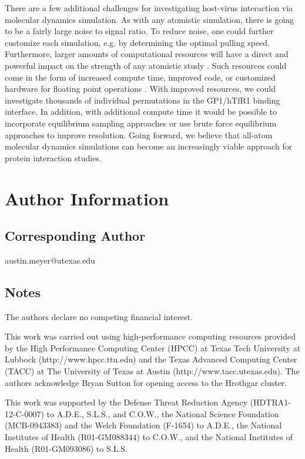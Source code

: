 \documentclass[journal=jacsat,manuscript=article]{achemso}
\begin{document}
There are a few additional challenges for investigating host-virus interaction via molecular dynamics simulation. As with any atomistic simulation, there is going to be a fairly large noise to signal ratio. To reduce noise, one could further customize each simulation, e.g. by determining the optimal pulling speed. Furthermore, larger amounts of computational resources will have a direct and powerful impact on the strength of any atomistic study \cite{Shaw2012}. Such resources could come in the form of increased compute time, improved code, or customized hardware for floating point operations \cite{Shaw2011}. With improved resources, we could investigate thousands of individual permutations in the GP1/hTfR1 binding interface. In addition, with additional compute time it would be possible to incorporate equilibrium sampling approaches \cite{Buch2011} or use brute force equilibrium approaches \cite{Giorgino2012} to improve resolution. Going forward, we believe that all-atom molecular dynamics simulations can become an increasingly viable approach for protein interaction studies. 

\section{Author Information}

\subsection{Corresponding Author}

austin.meyer@utexas.edu

\subsection{Notes}

The authors declare no competing financial interest.

\begin{acknowledgement}
This work was carried out using high-performance computing resources provided by the High Performance Computing Center (HPCC) at Texas Tech University at Lubbock (http://www.hpcc.ttu.edu) and the Texas Advanced Computing Center (TACC) at The University of Texas at Austin (http://www.tacc.utexas.edu). The authors acknowledge Bryan Sutton for opening access to the Hrothgar cluster.

This work was supported by the Defense Threat Reduction Agency (HDTRA1-12-C-0007) to A.D.E., S.L.S., and C.O.W., the National Science Foundation (MCB-0943383) and the Welch Foundation (F-1654) to A.D.E., the National Institutes of Health (R01-GM088344) to C.O.W., and the National Institutes of Health (R01-GM093086) to S.L.S.
\end{acknowledgement}
\end{document}
